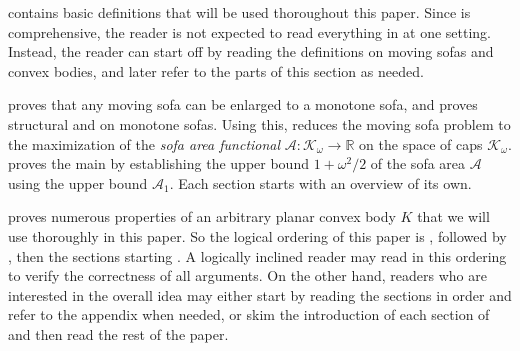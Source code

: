  contains basic definitions that will be used thoroughout this paper. Since  is comprehensive, the reader is not expected to read everything in  at one setting. Instead, the reader can start off by reading the definitions on moving sofas and convex bodies, and later refer to the parts of this section as needed.

 proves  that any moving sofa can be enlarged to a monotone sofa, and proves structural  and  on monotone sofas. Using this,  reduces the moving sofa problem to the maximization of the \emph{sofa area functional} \(\mathcal{A} : \mathcal{K}_\omega \to \mathbb{R}\) on the space of caps \(\mathcal{K}_\omega\).  proves the main  by establishing the upper bound \(1 + \omega^2/2\) of the sofa area \(\mathcal{A}\) using the upper bound \(\mathcal{A}_1\). Each section starts with an overview of its own.

 proves numerous properties of an arbitrary planar convex body \(K\) that we will use thoroughly in this paper. So the logical ordering of this paper is , followed by , then the sections starting . A logically inclined reader may read in this ordering to verify the correctness of all arguments. On the other hand, readers who are interested in the overall idea may either start by reading the sections in order and refer to the appendix when needed, or skim the introduction of each section of  and then read the rest of the paper.
